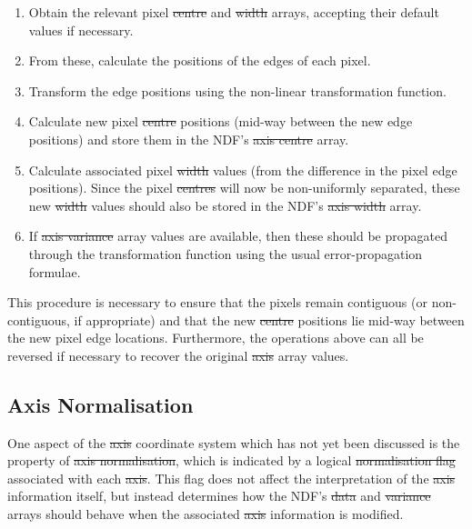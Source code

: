 \begin{enumerate}

\item Obtain the relevant pixel \st{centre\/} and \st{width\/} arrays,
accepting their default values if necessary. 

\item From these, calculate the positions of the edges of each pixel.

\item Transform the edge positions using the non-linear transformation 
function.

\item Calculate new pixel \st{centre\/} positions (mid-way between the new
edge positions) and store them in the NDF's \st{axis centre\/} array. 

\item Calculate associated pixel \st{width\/} values (from the difference
in the pixel edge positions). 
Since the pixel \st{centres\/} will now be non-uniformly separated, these
new \st{width\/} values should also be stored in the NDF's \st{axis
width\/} array. 

\item If \st{axis variance\/} array values are available, then these should
be propagated through the transformation function using the usual
error-propagation formulae. 

\end{enumerate}

This procedure is necessary to ensure that the pixels remain contiguous 
(or non-contiguous, if appropriate) and that the new \st{centre\/}
positions lie mid-way between the new pixel edge locations. 
Furthermore, the operations above can all be reversed if necessary to
recover the original \st{axis\/} array values. 

\subsection{\label{ss:axisnormalisation}Axis Normalisation}

One aspect of the \st{axis\/} coordinate system which has not yet been
discussed is the property of \st{axis normalisation}, which is indicated by
a logical \st{normalisation flag\/} associated with each \st{axis}. 
This flag does not affect the interpretation of the \st{axis\/} information
itself, but instead determines how the NDF's \st{data\/} and
\st{variance\/} arrays should behave when the associated \st{axis\/} 
information is modified. 

